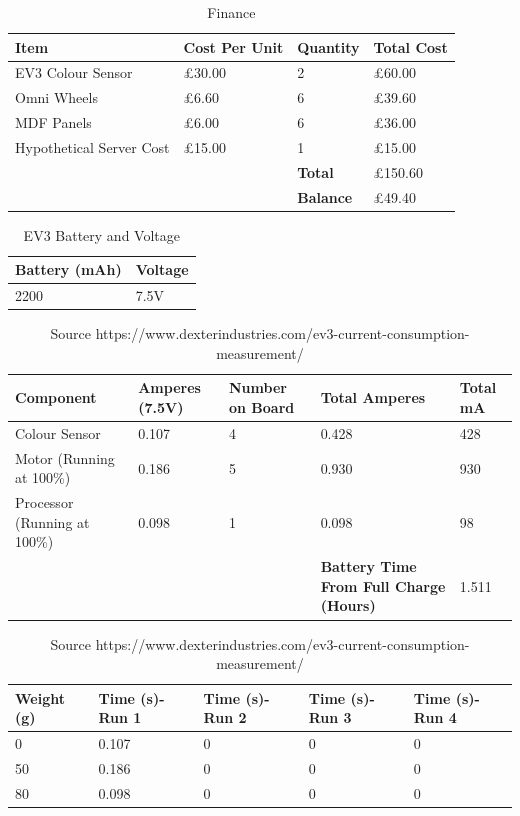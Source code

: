 \documentclass[a4paper]{article}
\begin{document}
\begin{center}
\begin{table}[!htb]
\centering
\begin{tabular}{| p{2cm} | p{2cm} | p{2cm} | p{2cm} |}
\hline
\textbf{Item} & \textbf{Cost Per Unit} & \textbf{Quantity} & \textbf{Total Cost} \\
\hline
EV3 Colour Sensor & £30.00 & 2 & £60.00 \\
\hline
Omni Wheels & £6.60 & 6 & £39.60 \\
\hline
MDF Panels & £6.00 & 6 & £36.00 \\
\hline
Hypothetical Server Cost & £15.00 & 1 & £15.00 \\ 
\hline
 &  & \textbf{Total} & £150.60 \\ 
\hline
 &  & \textbf{Balance} & £49.40 \\
\hline
\end{tabular}
\caption{Finance}
\end{table}


\begin{table}[!htb]
\centering
\begin{tabular}{| p{2cm} | p{2cm} |}
\hline
\textbf{Battery (mAh)} & \textbf{Voltage} \\
\hline
2200 & 7.5V \\
\hline
\end{tabular}
\caption{EV3 Battery and Voltage}
\end{table}

\begin{table}[!htb]
\centering
\begin{tabular}{| p{2.2cm} | p{2cm} | p{2.2cm} | p{2cm} | p{2cm} |}
\hline
\textbf{Component} & \textbf{Amperes (7.5V)} & \textbf{Number on Board} & \textbf{Total Amperes} & \textbf{Total mA}\\
\hline
Colour Sensor & 0.107 & 4 & 0.428 & 428 \\
\hline
Motor (Running at 100\%) & 0.186 & 5 & 0.930 & 930 \\
\hline 
Processor (Running at 100\%) & 0.098 & 1 & 0.098 & 98 \\
\hline
 & & & \textbf{Battery Time From Full Charge (Hours)} & 1.511 \\ 
 \hline
\end{tabular}
\caption{Source https://www.dexterindustries.com/ev3-current-consumption-measurement/}
\end{table}

\begin{table}[!htb]
\centering
\begin{tabular}{| p{2cm} | p{2cm} | p{2cm} | p{2cm} | p{2cm} |}
\hline
\textbf{Weight (g)} & \textbf{Time (s)-Run 1} & \textbf{Time (s)-Run 2} & \textbf{Time (s)-Run 3} & \textbf{Time (s)-Run 4} \\
\hline
0 & 0.107 & 0 & 0 & 0 \\
\hline
50 & 0.186 & 0 & 0 & 0 \\
\hline 
80 & 0.098 & 0 & 0 & 0 \\
 \hline
\end{tabular}
\caption{Source https://www.dexterindustries.com/ev3-current-consumption-measurement/}
\end{table}


\end{center}
\end{document}

